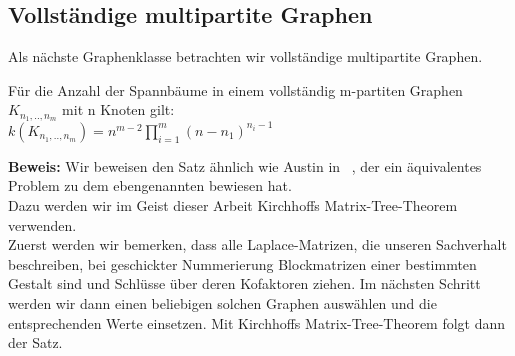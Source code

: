 \subsection{Vollständige multipartite Graphen}
Als nächste Graphenklasse betrachten wir vollständige multipartite Graphen.
\begin{Tms}
 Für die Anzahl der Spannbäume in einem vollständig m-partiten Graphen $K_{n_1,..,n_m}$ mit n Knoten gilt:\\
 $\mathit{k}(K_{n_1,..,n_m})=n^{m-2}\prod_{i=1}^{m}(n-n_1)^{n_i-1}$
\end{Tms}
\textbf{Beweis:}
Wir beweisen den Satz ähnlich wie Austin in ~\cite{austin_1960}, der ein äquivalentes Problem zu dem ebengenannten bewiesen hat.\\
Dazu werden wir im Geist dieser Arbeit Kirchhoffs Matrix-Tree-Theorem verwenden.\\
Zuerst werden wir bemerken, dass alle Laplace-Matrizen, die unseren Sachverhalt beschreiben, bei geschickter Nummerierung Blockmatrizen einer bestimmten Gestalt sind und Schlüsse über deren Kofaktoren  ziehen. Im nächsten Schritt werden wir dann einen beliebigen solchen Graphen auswählen und die entsprechenden Werte einsetzen. Mit Kirchhoffs Matrix-Tree-Theorem folgt dann der Satz.\\
